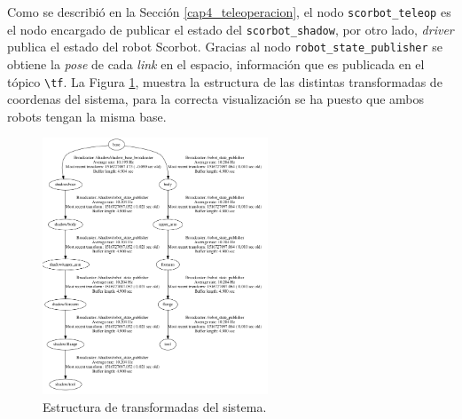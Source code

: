 Como se describió en la Sección \ref{cap4_teleoperacion}, el nodo \texttt{scorbot\_teleop} es el nodo encargado de publicar el estado del \texttt{scorbot\_shadow}, por otro lado, \textit{driver} publica el estado del robot Scorbot. Gracias al nodo \texttt{robot\_state\_publisher} se obtiene la \textit{pose} de cada \textit{link} en el espacio, información que es publicada en el tópico \texttt{\textbackslash tf}. La Figura \ref{cap4_tf}, muestra la estructura de las distintas transformadas de coordenas del sistema, para la correcta visualización se ha puesto que ambos robots tengan la misma base. 

\begin{figure}[H]
  \centering
  \includegraphics[width=0.6\textwidth]{img/cap4/tf.png}
  \caption{Estructura de transformadas del sistema.}
  \label{cap4_tf}
\end{figure}






